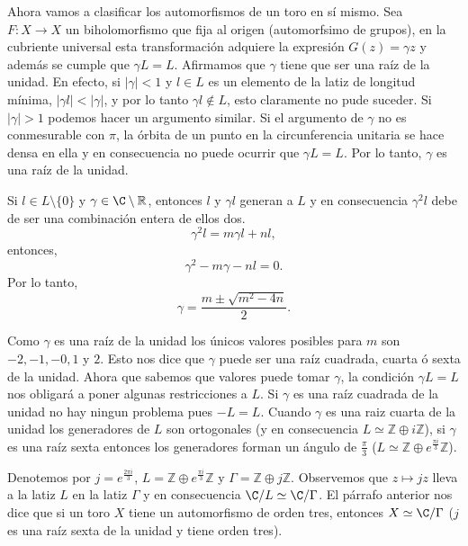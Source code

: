 Ahora vamos a clasificar los automorfismos de un toro en sí mismo. Sea $F\colon X\rightarrow X$ un biholomorfismo que fija al origen (automorfsimo de grupos), en la cubriente universal esta transformación adquiere la expresión $G(z)=\gamma z$ y además se cumple que $\gamma L=L$. Afirmamos que $\gamma$ tiene que ser una raíz de la unidad. En efecto, si $|\gamma|<1$ y $l\in L$ es un elemento de la latiz de longitud mínima, $|\gamma l|<|\gamma|$, y por lo tanto $\gamma l\notin L$, esto claramente no pude suceder. Si $|\gamma|>1$ podemos hacer un argumento similar. Si el argumento de $\gamma$ no es conmesurable con $\pi$, la órbita de un punto en la circunferencia unitaria se hace densa en ella y en consecuencia no puede ocurrir que $\gamma L = L$. Por lo tanto, $\gamma$ es una raíz de la unidad.

Si $l\in L\setminus \{ 0\}$ y $\gamma\in\C\setminus\mathbb{R}$, entonces $l$ y $\gamma l$ generan a $L$ y en consecuencia $\gamma^{2} l$ debe de ser una combinación entera de ellos dos.
\begin{equation*}
\gamma^{2} l =m\gamma l +nl,
\end{equation*}
\noindent entonces,
\begin{equation*}
\gamma^{2}-m\gamma-nl=0.
\end{equation*}
\noindent Por lo tanto,
\begin{equation}
\label{TorosPosibles}
\gamma=\frac{m\pm \sqrt{m^{2}-4n}}{2}.
\end{equation}

\noindent Como $\gamma$ es una raíz de la unidad los únicos valores posibles para $m$ son $-2,-1,-0,1$ y $2$. Esto nos dice que $\gamma$ puede ser una raíz cuadrada, cuarta ó sexta de la unidad. Ahora que sabemos que valores puede tomar $\gamma$, la condición $\gamma L =L$ nos obligará a poner algunas restricciones a $L$. Si $\gamma$ es una raíz cuadrada de la unidad no hay ningun problema pues $-L=L$. Cuando $\gamma$ es una raiz cuarta de la unidad los generadores de $L$ son ortogonales (y en consecuencia $L\simeq \mathbb{Z}\oplus i\mathbb{Z}$), si $\gamma$ es una raíz sexta entonces los generadores forman un ángulo de $\tfrac{\pi}{3}$ ($L\simeq \mathbb{Z}\oplus e^{\tfrac{\pi i}{3}}\mathbb{Z}$).

Denotemos por $j=e^{\tfrac{2\pi i}{3}}$, $L=\mathbb{Z}\oplus e^{\tfrac{\pi i}{3}}\mathbb{Z}$
y $\Gamma=\mathbb{Z}\oplus j\mathbb{Z}$. Observemos que $z\mapsto jz$ lleva a la latiz $L$ en la latiz $\Gamma$ y en consecuencia $\C/L\simeq\C/\Gamma$. El párrafo anterior nos dice que si un toro $X$ tiene un automorfismo de orden tres, entonces $X\simeq\C/\Gamma$ ($j$ es una raíz sexta de la unidad y tiene orden tres).
